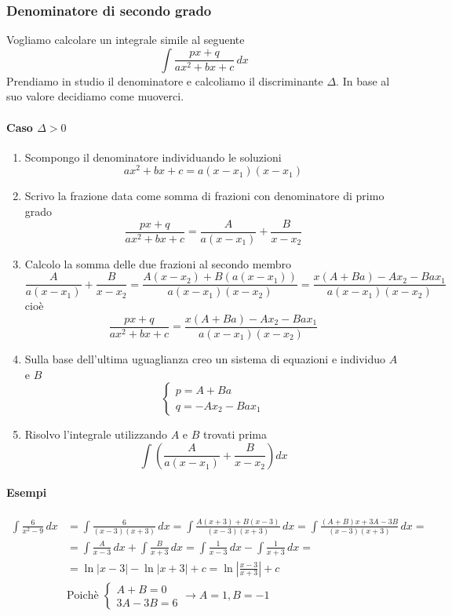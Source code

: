 \documentclass[11pt]{article}
\begin{document}
\subsubsection{Denominatore di secondo grado}
Vogliamo calcolare un integrale simile al seguente
\[\int\frac{px+q}{ax^2+bx+c}\,dx\]
Prendiamo in studio il denominatore e calcoliamo il discriminante $\Delta$. In base al suo valore decidiamo come muoverci.
\paragraph{Caso $\Delta > 0$} 
\begin{enumerate}
	\item Scompongo il denominatore individuando le soluzioni
	\[ax^2+bx+c=a(x-x_1)(x-x_1)\]
	\item Scrivo la frazione data come somma di frazioni con denominatore di primo grado
	\[\frac{px+q}{ax^2+bx+c}=\frac{A}{a(x-x_1)}+\frac{B}{x-x_2}\]
	\item Calcolo la somma delle due frazioni al secondo membro
	\[\frac{A}{a(x-x_1)}+\frac{B}{x-x_2}=\frac{A(x-x_2)+B\left(a(x-x_1)\right)}{a(x-x_1)(x-x_2)}=\frac{x(A+Ba)-Ax_2-Bax_1}{a(x-x_1)(x-x_2)}\]
	cioè 
	\[\frac{px+q}{ax^2+bx+c}=\frac{x(A+Ba)-Ax_2-Bax_1}{a(x-x_1)(x-x_2)}\]
	\item Sulla base dell'ultima uguaglianza creo un sistema di equazioni e individuo $A$ e $B$
	\[\begin{cases}p=A+Ba\\q=-Ax_2-Bax_1\end{cases}\]
	\item Risolvo l'integrale utilizzando $A$ e $B$ trovati prima
	\[\int\left(\frac{A}{a(x-x_1)}+\frac{B}{x-x_2}\right)dx\]
\end{enumerate}
\paragraph{Esempi}
\begin{align*}\int \frac{6}{x^2-9}\,dx&=\int \frac{6}{(x-3)(x+3)}\,dx=\int \frac{A(x+3)+B(x-3)}{(x-3)(x+3)}\,dx=\int 	\frac{(A+B)x+3A-3B}{(x-3)(x+3)}\,dx=\\&=\int \frac{A}{x-3}\,dx+\int \frac{B}{x+3}\,dx=\int \frac{1}{x-3}\,dx-\int \frac{1}{x+3}\,dx=\\&=\ln|x-3|-\ln|x+3|+c=\ln\left|\frac{x-3}{x+3}\right|+c\\&\text{Poichè }\begin{cases}A+B=0\\3A-3B=6\end{cases} \longrightarrow A=1, B=-1\end{align*}
\end{document}
